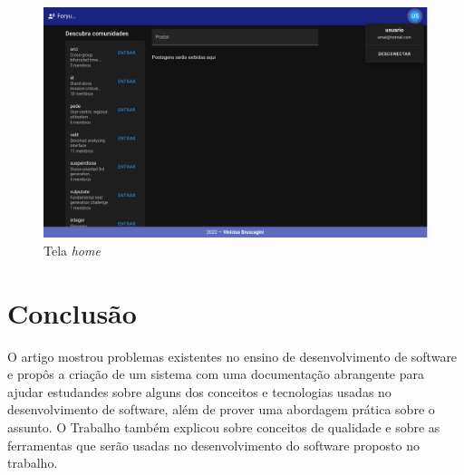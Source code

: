 \documentclass[12pt]{article}
\begin{document}
\begin{figure}[H]
    \centering
    \includegraphics[width=1\textwidth]{prints/home.png}
    \caption{Tela \textit{home}}\label{fig:home}
\end{figure}


\section{Conclusão}

O artigo mostrou problemas existentes no ensino de desenvolvimento de software e propôs
a criação de um sistema com uma documentação abrangente para ajudar estudandes sobre alguns dos
conceitos e tecnologias usadas no desenvolvimento de software, além de prover uma abordagem prática
sobre o assunto. O Trabalho também explicou sobre conceitos de qualidade e sobre as ferramentas que
serão usadas no desenvolvimento do software proposto no trabalho.


\end{document}
